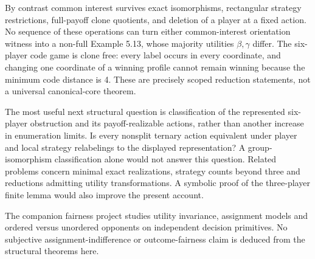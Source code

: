 By contrast common interest survives exact isomorphisms, rectangular strategy
restrictions, full-payoff clone quotients, and deletion of a player at a fixed
action. No sequence of these operations can turn either common-interest
orientation witness into a non-full Example 5.13, whose majority utilities
$\beta,\gamma$ differ. The six-player code game is clone free: every label
occurs in every coordinate, and changing one coordinate of a winning profile
cannot remain winning because the minimum code distance is 4. These are
precisely scoped reduction statements, not a universal canonical-core theorem.

The most useful next structural question is classification of the represented
six-player obstruction and its payoff-realizable actions, rather than another
increase in enumeration limits. Is every nonsplit ternary action equivalent
under player and local strategy relabelings to the displayed representation?
A group-isomorphism classification alone would not answer this question.
Related problems concern minimal exact realizations, strategy counts beyond
three and reductions admitting utility transformations. A symbolic proof of
the three-player finite lemma would also improve the present account.

The companion fairness project studies utility invariance, assignment models
and ordered versus unordered opponents on independent decision primitives.
No subjective assignment-indifference or outcome-fairness claim is deduced
from the structural theorems here.
